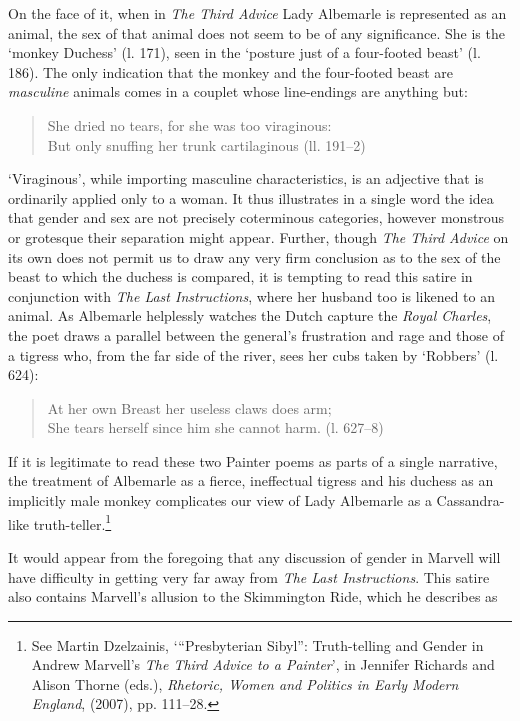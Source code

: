 ﻿\documentclass[12pt]{article}
\newcommand{\citedtitle}[1]{\textit{#1}}
\begin{document}
On
the face of it, when in \citedtitle{The Third Advice} Lady Albemarle is
represented as an animal, the sex of that animal does not seem to be of any
significance. She is the ‘monkey Duchess’ (l. 171), seen in the ‘posture just
of a four-footed beast’ (l. 186). The only indication that the monkey and the
four-footed beast are \emph{masculine} animals comes in a couplet whose
line-endings are anything but:

\begin{verse}
She dried no tears, for she was too viraginous:\\
But only snuffing her trunk cartilaginous (ll. 191–2)
\end{verse}

‘Viraginous’,
while importing masculine characteristics, is an adjective that is ordinarily
applied only to a woman. It thus illustrates in a single word the idea that
gender and sex are not precisely coterminous categories, however monstrous or
grotesque their separation might appear. Further, though \citedtitle{The
Third Advice} on its own does not permit us to draw any very firm conclusion as to the sex of
the beast to which the duchess is compared, it is tempting to read this satire
in conjunction with \citedtitle{The Last Instructions}, where her husband too is likened
to an animal. As Albemarle helplessly watches the Dutch capture the \textit{Royal
Charles},
the poet draws a parallel between the general’s frustration and rage and those
of a tigress who, from the far side of the river, sees her cubs taken by
‘Robbers’ (l. 624):

\begin{verse}
At her own Breast her useless claws does arm;\\
She tears herself since him she cannot harm. (l. 627–8)
\end{verse}

If
it is legitimate to read these two Painter poems as parts of a single narrative,
the treatment of Albemarle as a fierce, ineffectual tigress and his duchess as
an implicitly male monkey complicates our view of Lady Albemarle as a
Cassandra-like truth-teller.\footnote{See Martin Dzelzainis,
‘“Presbyterian Sibyl”: Truth-telling and Gender in Andrew Marvell’s \citedtitle{The
Third Advice to a Painter}’, in Jennifer Richards and Alison Thorne (eds.), \citedtitle{Rhetoric,
Women and Politics in Early Modern England}, (2007), pp. 111–28.}

It
would appear from the foregoing that any discussion of gender in Marvell will
have difficulty in getting very far away from \citedtitle{The Last Instructions}. This satire also
contains Marvell’s allusion to the Skimmington Ride, which he describes as
\end{document}
